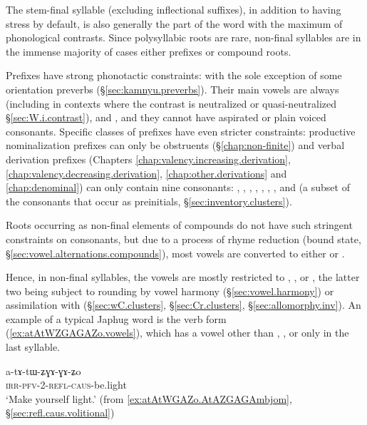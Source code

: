 The stem-final syllable (excluding inflectional suffixes), in addition to having stress by default, is also generally the part of the word with the maximum of phonological contrasts. Since polysyllabic roots are rare, non-final syllables are in the immense majority of cases either prefixes or compound roots.

Prefixes have strong phonotactic constraints: with the sole exception of some orientation preverbs (§\ref{sec:kamnyu.preverbs}). Their main vowels are always  (including  in contexts where the contrast is neutralized or quasi-neutralized §\ref{sec:W.i.contrast}),  and , and they cannot have aspirated or plain voiced consonants. Specific classes of prefixes have even stricter constraints: productive nominalization prefixes can only be obstruents (§\ref{chap:non-finite}) and  verbal derivation prefixes (Chapters \ref{chap:valency.increasing.derivation}, \ref{chap:valency.decreasing.derivation}, \ref{chap:other.derivations} and \ref{chap:denominal}) can only contain nine consonants: , , , ,  , ,  ,  and  (a subset of the consonants that occur as preinitials, §\ref{sec:inventory.clusters}).

Roots occurring as non-final elements of compounds do not have such stringent constraints on consonants, but due to a process of rhyme reduction (bound state, §\ref{sec:vowel.alternations.compounds}), most vowels are converted to either  or .

Hence, in non-final syllables, the vowels are mostly restricted to , , or , the latter two being subject to rounding by vowel harmony (§\ref{sec:vowel.harmony}) or assimilation with  (§\ref{sec:wC.clusters}, §\ref{sec:Cr.clusters}, §\ref{sec:allomorphy.inv}). An example of a typical Japhug word is the verb form  (\ref{ex:atAtWZGAGAZo.vowels}), which has a vowel other than , , or  only in the last syllable.

\begin{exe}
	\ex \label{ex:atAtWZGAGAZo.vowels}
	\gll a-tɤ-tɯ-ʑɣɤ-ɣɤ-ʑo \\
	\textsc{irr}-\textsc{pfv}-2-\textsc{refl}-\textsc{caus}-be.light \\
	\glt `Make yourself light.' (from \ref{ex:atAtWGAZo.AtAZGAGAmbjom}, §\ref{sec:refl.caus.volitional})
\end{exe}


